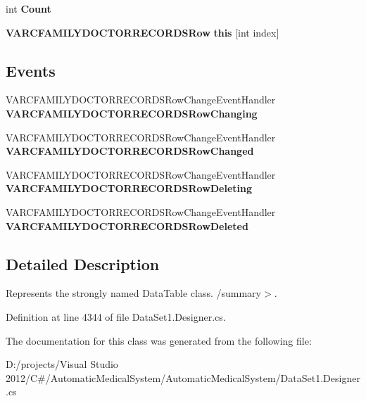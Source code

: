 \begin{CompactItemize}
\item 
int \textbf{Count}\hspace{0.3cm}{\tt  [get]}\label{class_automatic_medical_system_1_1_data_set1_1_1_v_a_r_c_f_a_m_i_l_y_d_o_c_t_o_r_r_e_c_o_r_d_s_data_table_9c8d768a208350045755d3d70ffaec2d}

\item 
{\bf VARCFAMILYDOCTORRECORDSRow} \textbf{this} [int index]\hspace{0.3cm}{\tt  [get]}\label{class_automatic_medical_system_1_1_data_set1_1_1_v_a_r_c_f_a_m_i_l_y_d_o_c_t_o_r_r_e_c_o_r_d_s_data_table_51af395df654a3e74225b28b1257e9b1}

\end{CompactItemize}
\subsection*{Events}
\begin{CompactItemize}
\item 
VARCFAMILYDOCTORRECORDSRowChangeEventHandler \textbf{VARCFAMILYDOCTORRECORDSRowChanging}\label{class_automatic_medical_system_1_1_data_set1_1_1_v_a_r_c_f_a_m_i_l_y_d_o_c_t_o_r_r_e_c_o_r_d_s_data_table_2affcb3901beb1146ffe735e87b387e5}

\item 
VARCFAMILYDOCTORRECORDSRowChangeEventHandler \textbf{VARCFAMILYDOCTORRECORDSRowChanged}\label{class_automatic_medical_system_1_1_data_set1_1_1_v_a_r_c_f_a_m_i_l_y_d_o_c_t_o_r_r_e_c_o_r_d_s_data_table_84969d1355c9fc12e1027e29e1098f51}

\item 
VARCFAMILYDOCTORRECORDSRowChangeEventHandler \textbf{VARCFAMILYDOCTORRECORDSRowDeleting}\label{class_automatic_medical_system_1_1_data_set1_1_1_v_a_r_c_f_a_m_i_l_y_d_o_c_t_o_r_r_e_c_o_r_d_s_data_table_68304db8d93cde844a6c57c94cba5657}

\item 
VARCFAMILYDOCTORRECORDSRowChangeEventHandler \textbf{VARCFAMILYDOCTORRECORDSRowDeleted}\label{class_automatic_medical_system_1_1_data_set1_1_1_v_a_r_c_f_a_m_i_l_y_d_o_c_t_o_r_r_e_c_o_r_d_s_data_table_da8e449fc29a6391a4d2fa878dfd4ca5}

\end{CompactItemize}


\subsection{Detailed Description}
Represents the strongly named DataTable class. /summary$>$. 

Definition at line 4344 of file DataSet1.Designer.cs.

The documentation for this class was generated from the following file:\begin{CompactItemize}
\item 
D:/projects/Visual Studio 2012/C\#/AutomaticMedicalSystem/AutomaticMedicalSystem/DataSet1.Designer.cs\end{CompactItemize}
